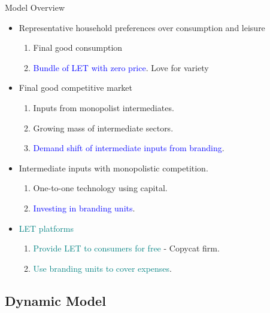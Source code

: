 \documentclass[usenames,dvipsnames,aspectratio=169]{beamer}
\begin{document}
\begin{frame}{Model Overview}
\begin{itemize}
    \item Representative household preferences over consumption and leisure
    \begin{enumerate}
        \item Final good consumption
        \item \textcolor{blue}{Bundle of LET with zero price}. Love for variety
    \end{enumerate}
    \pause 
    \item Final good competitive market
    \begin{enumerate}
        \item Inputs from monopolist intermediates. 
        \item Growing mass of intermediate sectors. 
        \item \textcolor{blue}{Demand shift of intermediate inputs from branding}. 
    \end{enumerate}
    \pause 
    \item Intermediate inputs with monopolistic competition. 
    \begin{enumerate}
        \item One-to-one technology using capital. 
        \item \textcolor{blue}{Investing in branding units}.
    \end{enumerate}
    \pause 
    \item \textcolor{teal}{LET platforms}
    \begin{enumerate}
        \item \textcolor{teal}{Provide LET to consumers for free} - Copycat firm. 
        \item \textcolor{teal}{Use branding units to cover expenses}.
    \end{enumerate}
\end{itemize}
    
\end{frame}

\subsection{Dynamic Model}
\end{document}
